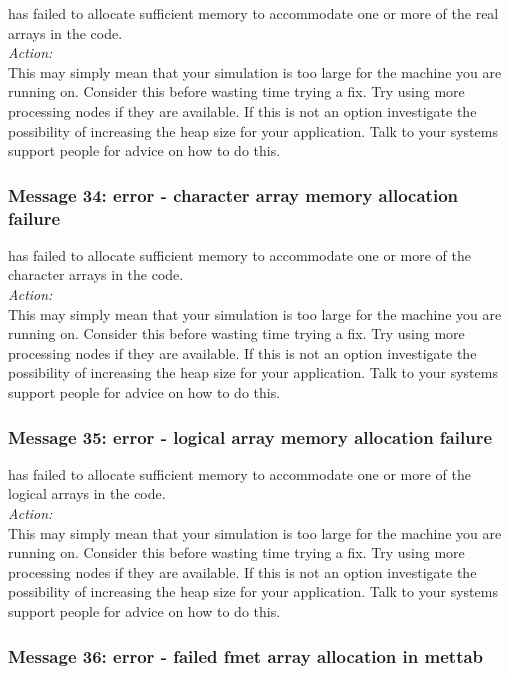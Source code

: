 \D{} has failed to allocate sufficient memory to accommodate one or more
of the real arrays in the code. \\

\noindent
{\em Action:} \\ This may simply mean that your simulation is too
large for the machine you are running on. Consider this before wasting
time trying a fix. Try using more processing nodes if they are
available. If this is not an option investigate the possibility of
increasing the heap size for your application. Talk to your systems
support people for advice on how to do this. 

\subsubsection*{Message 34: error - character array memory allocation
failure}

\D{} has failed to allocate sufficient memory to accommodate one or more
of the character arrays in the code. \\

\noindent
{\em Action:} \\ This may simply mean that your simulation is too
large for the machine you are running on. Consider this before wasting
time trying a fix. Try using more processing nodes if they are
available. If this is not an option investigate the possibility of
increasing the heap size for your application. Talk to your systems
support people for advice on how to do this. 

\subsubsection*{Message 35: error - logical array memory allocation
failure}

\D{} has failed to allocate sufficient memory to accommodate one or more
of the logical arrays in the code. \\

\noindent
{\em Action:} \\ This may simply mean that your simulation is too
large for the machine you are running on. Consider this before wasting
time trying a fix. Try using more processing nodes if they are
available. If this is not an option investigate the possibility of
increasing the heap size for your application. Talk to your systems
support people for advice on how to do this. 

\subsubsection*{Message 36: error - failed fmet array allocation in
mettab}

